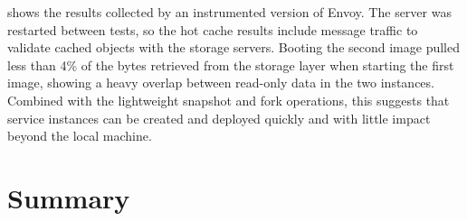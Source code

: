  shows the results collected by an instrumented version of Envoy. The server was restarted between tests, so the hot cache results include message traffic to validate cached objects with the storage servers. Booting the second image pulled less than 4\% of the bytes retrieved from the storage layer when starting the first image, showing a heavy overlap between read-only data in the two instances. Combined with the lightweight snapshot and fork operations, this suggests that service instances can be created and deployed quickly and with little impact beyond the local machine.

\section{Summary}
